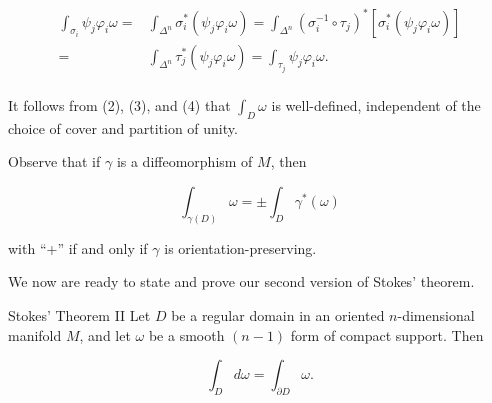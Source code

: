 \begin{equation}
\tag{4}\label{eq:4.8:4}
\begin{aligned}{\int_{\sigma_{i}}\psi_{j}\varphi_{i}\omega=}&{{}\int_{\Delta^{n}}\sigma_{i}^{*}(\psi_{j}\varphi_{i}\omega)=\int_{\Delta^{n}}(\sigma_{i}^{-1}\circ\tau_{j})^{*}[\sigma_{i}^{*}(\psi_{j}\varphi_{i}\omega)]}\\ {=}&{{}\int_{\Delta^{n}}\tau_{j}^{*}(\psi_{j}\varphi_{i}\omega)=\int_{\tau_{j}}\psi_{j}\varphi_{i}\omega.}\\ \end{aligned}
\end{equation}

It follows from (2), (3), and (4) that $\int_{D} \omega$ is well-defined, independent of the choice of cover and partition of unity.

Observe that if $\gamma$ is a diffeomorphism of $M$, then

\begin{equation}
\tag{5}\label{eq:4.8:5}
\int_{\gamma(D)}\omega=\pm\int_{D}\gamma^{*}(\omega)
\end{equation}

with “+” if and only if  $ \gamma $ is orientation-preserving.

We now are ready to state and prove our second version of Stokes' theorem.

\begin{theorem}{Stokes' Theorem II}\label{thm:4.9}
Let $D$ be a regular domain in an oriented $n$-dimensional manifold $M$, and let $\omega$ be a smooth $(n-1)$ form of compact support. Then

\begin{equation}
\tag{1}\label{eq:4.9:1}
\int_{D}d\omega=\int_{\partial D}\omega.
\end{equation}

\end{theorem}

